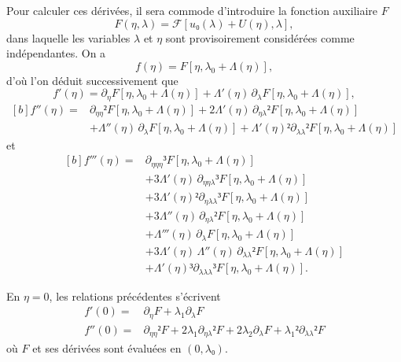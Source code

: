 \documentclass[12pt, final]{amsart}
\begin{document}
Pour calculer ces dérivées, il sera commode d'introduire la fonction auxiliaire
\(F\)
\begin{equation}
  F(η, \lambda)=\mathcal F[u₀(\lambda)+U(η), \lambda],
\end{equation}
dans laquelle les variables \(\lambda\) et \(η\) sont provisoirement
considérées comme indépendantes. On a
\begin{equation}
  f(η)=F[η, \lambda_0+\Lambda(η)],
\end{equation}
d'où l'on déduit successivement que
\begin{equation}
  \label{eq:20211112162417}
  f'(η)=\partial_η F[η, \lambda_0+\Lambda(η)]
  +\Lambda'(η)\,\partial_\lambda F[η, \lambda_0+\Lambda(η)],
\end{equation}
\begin{equation}
  \begin{aligned}[b]
    \label{eq:20211112165810}
    f''(η)={}&\partial_{ηη}²F[η, \lambda_0+\Lambda(η)]
    +2\Lambda'(η)\,\partial_{η\lambda}²F[η, \lambda_0+\Lambda(η)]\\
    &+\Lambda''(η)\,\partial_\lambda F[η, \lambda_0+\Lambda(η)]
    +\Lambda'(η)²\partial_{\lambda\lambda}²F[η, \lambda_0+\Lambda(η)]
  \end{aligned}
\end{equation}
et
\begin{equation}
  \label{eq:20211112173223}
  \begin{aligned}[b]
    f'''(η)={}&\partial_{ηηη}³F[η, \lambda_0+\Lambda(η)]\\
    &+3\Lambda'(η)\,\partial_{ηη\lambda}³F[η, \lambda_0+\Lambda(η)]\\
    &+3\Lambda'(η)²\partial_{η\lambda\lambda}³F[η, \lambda_0+\Lambda(η)]\\
    &+3\Lambda''(η)\,\partial_{η\lambda}²F[η, \lambda_0+\Lambda(η)]\\
    &+\Lambda'''(η)\,\partial_\lambda F[η, \lambda_0+\Lambda(η)]\\
    &+3\Lambda'(η)\,\Lambda''(η)\,\partial_{\lambda\lambda}²F[η, \lambda_0+\Lambda(η)]\\
    &+\Lambda'(η)³\partial_{\lambda\lambda\lambda}³F[η, \lambda_0+\Lambda(η)].
  \end{aligned}
\end{equation}

En \(η=0\), les relations précédentes s'écrivent
\begin{align}
  f'(0)={}&\partial_η F+\lambda_1\partial_\lambda F\\
  f''(0)={}&\partial_{ηη}²F+2\lambda_1\partial_{η\lambda}²F
             +2\lambda_2\partial_\lambda F+\lambda_1²\partial_{\lambda\lambda}²F
\end{align}
où \(F\) et ses dérivées sont évaluées en \((0, λ₀)\).
\end{document}
